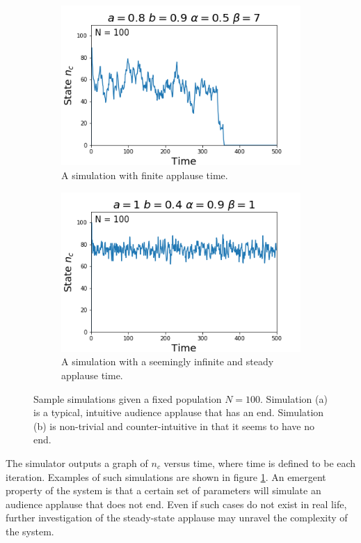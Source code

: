 \dimendef{}
\begin{figure}[h!]
  \centering
  \begin{subfigure}[b]{0.4\linewidth}
    \includegraphics[width=\linewidth]{images/chapter2/simA.png}
    \caption{A simulation with finite applause time.}
  \end{subfigure}
  \begin{subfigure}[b]{0.4\linewidth}
    \includegraphics[width=\linewidth]{images/chapter2/simB.png}
    \caption{A simulation with a seemingly infinite and steady applause time.}
  \end{subfigure}
  \caption{Sample simulations given a fixed population $N = 100$. Simulation (a) is a typical, intuitive audience applause that has an end. Simulation (b) is non-trivial and counter-intuitive in that it seems to have no end.}
  \label{fig:simulations}
\end{figure}




The simulator outputs a graph of $n_{c}$ versus time, where time is defined to be each iteration.
Examples of such simulations are shown in figure \ref{fig:simulations}.
An emergent property of the system is that a certain set of parameters will simulate an audience applause that does not end.
Even if such cases do not exist in real life, further investigation of the steady-state applause may unravel the complexity of the system.


